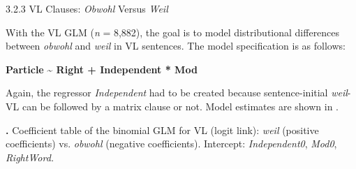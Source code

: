 \begin{styleMoutonHeadingii}
3.2.3  VL Clauses: \textit{Obwohl} Versus \textit{Weil}
\end{styleMoutonHeadingii}

\begin{styleMoutonTextBeforeExample}
With the VL GLM (\textit{n} = 8,882), the goal is to model distributional differences between \textit{obwohl} and \textit{weil} in VL sentences. The model specification is as follows:
\end{styleMoutonTextBeforeExample}

\begin{styleMoutonText}
\textbf{Particle} \textbf{{\textasciitilde} Right + Independent * Mod}
\end{styleMoutonText}

\begin{styleMoutonTextAfterExample}
Again, the regressor \textit{Independent} had to be created because sentence-initial \textit{weil}{}-VL can be followed by a matrix clause or not. Model estimates are shown in .
\end{styleMoutonTextAfterExample}

\begin{styleMoutonCaption}
\textbf{.} Coefficient table of the binomial GLM for VL (logit link): \textit{weil} (positive coefficients) vs. \textit{obwohl} (negative coefficients). Intercept: \textit{Independent0}, \textit{Mod0}, \textit{RightWord.}
\end{styleMoutonCaption}

\tablefirsthead{}

